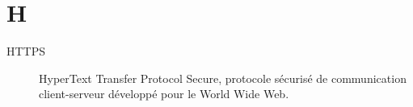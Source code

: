 \section{H}

\begin{description}

\item[HTTPS] HyperText Transfer Protocol Secure, protocole sécurisé de 
communication client-serveur développé pour le World Wide Web.

\end{description}
